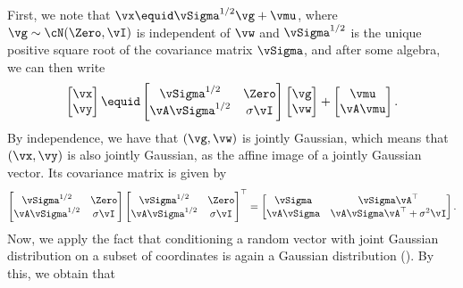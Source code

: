 \documentclass[../../book-main.tex]{subfiles}
\begin{document}
\begin{example}
    First, we note that $\vx \equid \vSigma^{1/2} \vg + \vmu$, where $\vg \sim
    \cN(\Zero, \vI)$ is independent of $\vw$ and $\vSigma^{1/2}$ is the unique
    positive square root of the covariance matrix $\vSigma$, and
    after some algebra, we can then write
    \begin{equation*}
        \begin{bmatrix}
            \vx \\
            \vy
        \end{bmatrix}
        \equid
        \begin{bmatrix}
            \vSigma^{1/2} & \Zero \\
            \vA \vSigma^{1/2} & \sigma \vI
        \end{bmatrix}
        \begin{bmatrix}
            \vg \\
            \vw
        \end{bmatrix}
        +
        \begin{bmatrix}
            \vmu \\
            \vA\vmu
        \end{bmatrix}.
    \end{equation*}
    By independence, we have that $(\vg, \vw)$ is jointly Gaussian,
    which means that
    $(\vx, \vy)$ is also jointly Gaussian, as the affine image of a
    jointly Gaussian
    vector.
    Its covariance matrix is given by
    \begin{equation*}
        \begin{bmatrix}
            \vSigma^{1/2} & \Zero \\
            \vA \vSigma^{1/2} & \sigma \vI
        \end{bmatrix}
        \begin{bmatrix}
            \vSigma^{1/2} & \Zero \\
            \vA \vSigma^{1/2} & \sigma \vI
        \end{bmatrix}^\top
        =
        \begin{bmatrix}
            \vSigma & \vSigma \vA^\top \\
            \vA \vSigma & \vA \vSigma \vA^\top + \sigma^2 \vI
        \end{bmatrix}.
    \end{equation*}
    Now, we apply the fact that conditioning a random vector with joint Gaussian
    distribution on a subset of coordinates is again a Gaussian distribution
    ().
    By this, we obtain that

\end{example}
\end{document}
